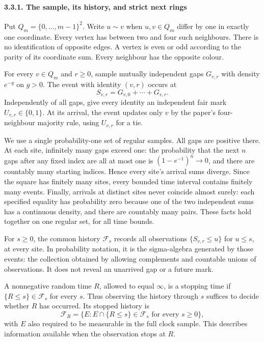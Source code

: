 \documentclass[
  11pt,
  a4paper,
]{article}
\begin{document}
\paragraph{3.3.1. The sample, its history, and strict next
rings}\label{the-sample-its-history-and-strict-next-rings}

Put \(Q_m=\{0,\ldots,m-1\}^2\). Write \(u\sim v\) when \(u,v\in Q_m\)
differ by one in exactly one coordinate. Every vertex has between two
and four such neighbours. There is no identification of opposite edges.
A vertex is even or odd according to the parity of its coordinate sum.
Every neighbour has the opposite colour.

For every \(v\in Q_m\) and \(r\geq0\), sample mutually independent gaps
\(G_{v,r}\) with density \(e^{-g}\) on \(g>0\). The event with identity
\((v,r)\) occurs at \[
S_{v,r}=G_{v,0}+\cdots+G_{v,r}.
\] Independently of all gaps, give every identity an independent fair
mark \(U_{v,r}\in\{0,1\}\). At its arrival, the event updates only \(v\)
by the paper's four-neighbour majority rule, using \(U_{v,r}\) for a
tie.

We use a single probability-one set of regular samples. All gaps are
positive there. At each site, infinitely many gaps exceed one: the
probability that the next \(n\) gaps after any fixed index are all at
most one is \((1-e^{-1})^n\to0\), and there are countably many starting
indices. Hence every site's arrival sums diverge. Since the square has
finitely many sites, every bounded time interval contains finitely many
events. Finally, arrivals at distinct sites never coincide almost
surely: each specified equality has probability zero because one of the
two independent sums has a continuous density, and there are countably
many pairs. These facts hold together on one regular set, for all time
bounds.

For \(s\geq0\), the common history \(\mathcal F_s\) records all
observations \(\{S_{v,r}\leq u\}\) for \(u\leq s\), at every site. In
probability notation, it is the sigma-algebra generated by those events:
the collection obtained by allowing complements and countable unions of
observations. It does not reveal an unarrived gap or a future mark.

A nonnegative random time \(R\), allowed to equal \(\infty\), is a
stopping time if \(\{R\leq s\}\in\mathcal F_s\) for every \(s\). Thus
observing the history through \(s\) suffices to decide whether \(R\) has
occurred. Its stopped history is \[
\mathcal F_R=\{E:E\cap\{R\leq s\}\in\mathcal F_s\text{ for every }s\geq0\},
\] with \(E\) also required to be measurable in the full clock sample.
This describes information available when the observation stops at
\(R\).
\end{document}
